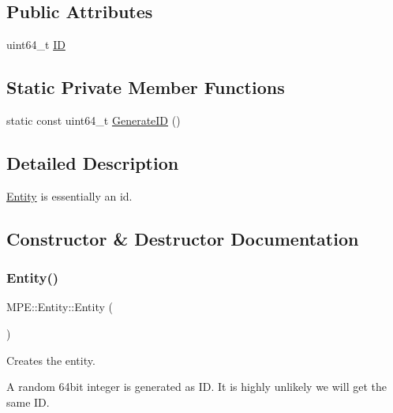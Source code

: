 \subsection*{Public Attributes}
\begin{DoxyCompactItemize}
\item 
uint64\+\_\+t \hyperlink{struct_m_p_e_1_1_entity_a04ff49ec80c37388b0e6a75cec860ceb}{ID}
\end{DoxyCompactItemize}
\subsection*{Static Private Member Functions}
\begin{DoxyCompactItemize}
\item 
static const uint64\+\_\+t \hyperlink{struct_m_p_e_1_1_entity_a629768de1229b78f58ef62534fe74663}{Generate\+ID} ()
\end{DoxyCompactItemize}


\subsection{Detailed Description}
\hyperlink{struct_m_p_e_1_1_entity}{Entity} is essentially an id. 

\subsection{Constructor \& Destructor Documentation}
\mbox{\label{struct_m_p_e_1_1_entity_a7a748d33b99ad088cd933578ad4533f6}} 
\subsubsection{\texorpdfstring{Entity()}{Entity()}\hspace{0.1cm}{\footnotesize\ttfamily [1/2]}}
{\footnotesize\ttfamily M\+P\+E\+::\+Entity\+::\+Entity (\begin{DoxyParamCaption}{ }\end{DoxyParamCaption})\hspace{0.3cm}{\ttfamily [inline]}}



Creates the entity. 

A random 64bit integer is generated as ID. It is highly unlikely we will get the same ID. \mbox{\label{struct_m_p_e_1_1_entity_acf0e7947c1814f2984de87590963360d}} 
